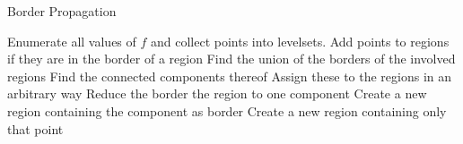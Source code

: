 \documentclass[11pt,twoside,twocolumn,a4paper]{article}
\theoremstyle{plain}
\theoremstyle{definition}
\begin{document}
\begin{algorithm}
\caption{Border Propagation}
\begin{algorithmic}
\State Enumerate all values of $f$ and collect points into levelsets.
    \State Add points to regions if they are in the border of a region
        \State Find the union of the borders of the involved regions
        \State Find the connected components thereof
        \State Assign these to the regions in an arbitrary way
	\EndIf
        \State Reduce the border the region to one component
            \State Create a new region containing the component as border
		\EndFor
    \EndIf
        \State Create a new region containing only that point
	\EndFor
\EndFor
\end{algorithmic}
\end{algorithm}
\end{document}
